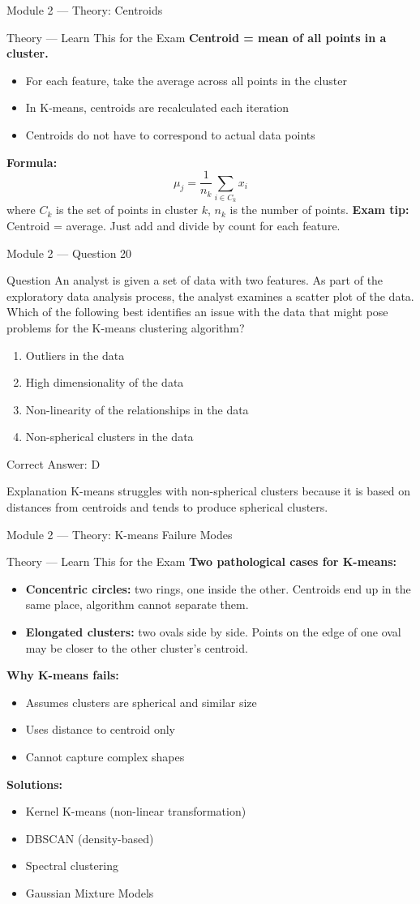 \documentclass[aspectratio=169,10pt]{beamer}
\newcommand{\question}[1]{%
	\begin{block}{Question}
		#1
	\end{block}
}
\newcommand{\options}[4]{%
	\begin{enumerate}[label=\Alph*.,leftmargin=*]
		\item #1
		\item #2
		\item #3
		\item #4
	\end{enumerate}
}
\newcommand{\answerbox}[1]{%
	\begin{exampleblock}{Correct Answer: #1}
	\end{exampleblock}
}
\newcommand{\explain}[1]{%
	\begin{block}{Explanation}
		\small #1
	\end{block}
}
\newcommand{\theory}[1]{%
	\begin{block}{Theory --- Learn This for the Exam}
		\small #1
	\end{block}
}
\begin{document}
	\begin{frame}{Module 2 --- Theory: Centroids}
		\theory{
			\textbf{Centroid = mean of all points in a cluster.}
			\begin{itemize}
				\item For each feature, take the average across all points in the cluster
				\item In K-means, centroids are recalculated each iteration
				\item Centroids do not have to correspond to actual data points
			\end{itemize}
			\textbf{Formula:}
			\[
			\mu_j = \frac{1}{n_k} \sum_{i \in C_k} x_i
			\]
			where $C_k$ is the set of points in cluster $k$, $n_k$ is the number of points.
			\textbf{Exam tip:} Centroid = average. Just add and divide by count for each feature.
		}
	\end{frame}
	
	\begin{frame}{Module 2 --- Question 20}
		\question{An analyst is given a set of data with two features. As part of the exploratory data analysis process, the analyst examines a scatter plot of the data. Which of the following best identifies an issue with the data that might pose problems for the K-means clustering algorithm?}
		\options{Outliers in the data}{High dimensionality of the data}{Non-linearity of the relationships in the data}{Non-spherical clusters in the data}
		\answerbox{D}
		\explain{K-means struggles with non-spherical clusters because it is based on distances from centroids and tends to produce spherical clusters.}
	\end{frame}
	
	\begin{frame}{Module 2 --- Theory: K-means Failure Modes}
		\theory{
			\textbf{Two pathological cases for K-means:}
			\begin{itemize}
				\item \textbf{Concentric circles:} two rings, one inside the other. Centroids end up in the same place, algorithm cannot separate them.
				\item \textbf{Elongated clusters:} two ovals side by side. Points on the edge of one oval may be closer to the other cluster's centroid.
			\end{itemize}
			\textbf{Why K-means fails:}
			\begin{itemize}
				\item Assumes clusters are spherical and similar size
				\item Uses distance to centroid only
				\item Cannot capture complex shapes
			\end{itemize}
			\textbf{Solutions:}
			\begin{itemize}
				\item Kernel K-means (non-linear transformation)
				\item DBSCAN (density-based)
				\item Spectral clustering
				\item Gaussian Mixture Models
			\end{itemize}
		}
	\end{frame}
	
\end{document}

